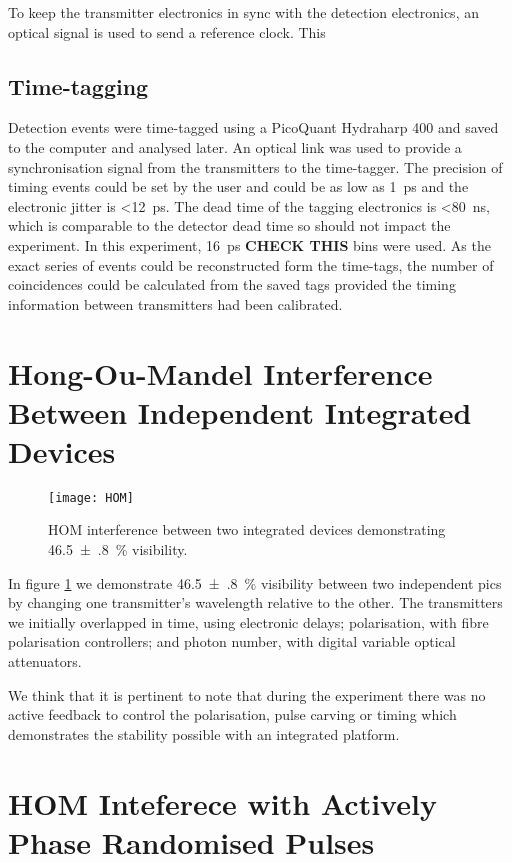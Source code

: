 {To keep the transmitter electronics in sync with the detection electronics, an optical signal is used to send a reference clock. This 

\subsection{Time-tagging}

Detection events were time-tagged using a PicoQuant Hydraharp 400 and saved to the computer and analysed later. An optical link was used to provide a synchronisation signal from the transmitters to the time-tagger. The precision of timing events could be set by the user and could be as low as \SI{1}{\ps} and the electronic jitter is \SI{<12}{\ps}. The dead time of the tagging electronics is \SI{<80}{\ns}, which is comparable to the detector dead time so should not impact the experiment. In this experiment, \SI{16}{\ps} \textbf{CHECK THIS} bins were used. As the exact series of events could be reconstructed form the time-tags, the number of coincidences could be calculated from the saved tags provided the timing information between transmitters had been calibrated.

\section{Hong-Ou-Mandel Interference Between Independent Integrated Devices}

\begin{figure}[tbp]
	\centering
	\texttt{[image: HOM]}
	\caption[Hong-Ou-Mandel interference between integrated devices]{\ac{HOM} interference between two integrated devices demonstrating \SI{46.5(8)}{\%} visibility.}
	\label{fig:HOM}
\end{figure}

In figure \ref{fig:HOM} we demonstrate \SI{46.5(8)}{\%} visibility between two independent \acp{pic} by changing one transmitter's wavelength relative to the other. The transmitters we initially overlapped in time, using electronic delays; polarisation, with fibre polarisation controllers; and photon number, with digital variable optical attenuators. 

We think that it is pertinent to note that during the experiment there was no active feedback to control the polarisation, pulse carving or timing which demonstrates the stability possible with an integrated platform. 

\section{HOM Inteferece with Actively Phase Randomised Pulses}

}
